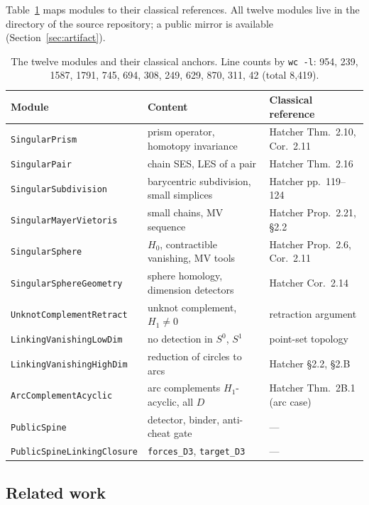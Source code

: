 \documentclass[11pt]{article}
\theoremstyle{remark}
\newcommand{\leanname}[1]{\texttt{#1}}
\begin{document}
Table~\ref{tab:contrib} maps modules to their classical references. All
twelve modules live in the directory
 of the source repository; a public
mirror is available (Section~\ref{sec:artifact}).

\begin{table}[t]
\centering
\small
\begin{tabular}{@{}lll@{}}
\toprule
Module & Content & Classical reference \\
\midrule
\leanname{SingularPrism} & prism operator, homotopy invariance & Hatcher Thm.~2.10, Cor.~2.11 \\
\leanname{SingularPair} & chain SES, LES of a pair & Hatcher Thm.~2.16 \\
\leanname{SingularSubdivision} & barycentric subdivision, small simplices & Hatcher pp.~119--124 \\
\leanname{SingularMayerVietoris} & small chains, MV sequence & Hatcher Prop.~2.21, \S 2.2 \\
\leanname{SingularSphere} & $H_0$, contractible vanishing, MV tools & Hatcher Prop.~2.6, Cor.~2.11 \\
\leanname{SingularSphereGeometry} & sphere homology, dimension detectors & Hatcher Cor.~2.14 \\
\leanname{UnknotComplementRetract} & unknot complement, $H_1 \ne 0$ & retraction argument \\
\leanname{LinkingVanishingLowDim} & no detection in $S^0$, $S^1$ & point-set topology \\
\leanname{LinkingVanishingHighDim} & reduction of circles to arcs & Hatcher \S 2.2, \S 2.B \\
\leanname{ArcComplementAcyclic} & arc complements $H_1$-acyclic, all $D$ & Hatcher Thm.~2B.1 (arc case) \\
\leanname{PublicSpine} & detector, binder, anti-cheat gate & --- \\
\leanname{PublicSpineLinkingClosure} & \leanname{forces\_D3}, \leanname{target\_D3} & --- \\
\bottomrule
\end{tabular}
\caption{The twelve modules and their classical anchors. Line counts by
\texttt{wc -l}: 954, 239, 1587, 1791, 745, 694, 308, 249, 629, 870, 311, 42
(total 8{,}419).}
\label{tab:contrib}
\end{table}

\subsection{Related work}
\end{document}

